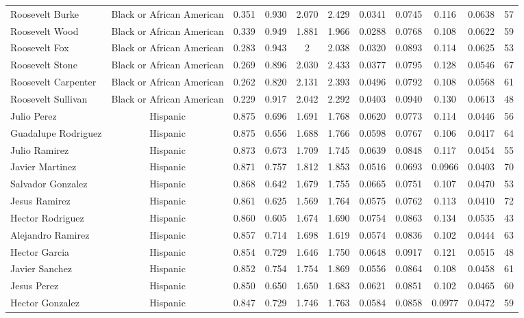 \documentclass[]{article}
\begin{document}
\begin{tabular}{lcccccccccc}
Roosevelt Burke & Black or African American & 0.351 & 0.930 & 2.070 & 2.429 & 0.0341 & 0.0745 & 0.116 & 0.0638 & 57 \\
Roosevelt Wood & Black or African American & 0.339 & 0.949 & 1.881 & 1.966 & 0.0288 & 0.0768 & 0.108 & 0.0622 & 59 \\
Roosevelt Fox & Black or African American & 0.283 & 0.943 & 2 & 2.038 & 0.0320 & 0.0893 & 0.114 & 0.0625 & 53 \\
Roosevelt Stone & Black or African American & 0.269 & 0.896 & 2.030 & 2.433 & 0.0377 & 0.0795 & 0.128 & 0.0546 & 67 \\
Roosevelt Carpenter & Black or African American & 0.262 & 0.820 & 2.131 & 2.393 & 0.0496 & 0.0792 & 0.108 & 0.0568 & 61 \\
Roosevelt Sullivan & Black or African American & 0.229 & 0.917 & 2.042 & 2.292 & 0.0403 & 0.0940 & 0.130 & 0.0613 & 48 \\
Julio Perez & Hispanic & 0.875 & 0.696 & 1.691 & 1.768 & 0.0620 & 0.0773 & 0.114 & 0.0446 & 56 \\
Guadalupe Rodriguez & Hispanic & 0.875 & 0.656 & 1.688 & 1.766 & 0.0598 & 0.0767 & 0.106 & 0.0417 & 64 \\
Julio Ramirez & Hispanic & 0.873 & 0.673 & 1.709 & 1.745 & 0.0639 & 0.0848 & 0.117 & 0.0454 & 55 \\
Javier Martinez & Hispanic & 0.871 & 0.757 & 1.812 & 1.853 & 0.0516 & 0.0693 & 0.0966 & 0.0403 & 70 \\
Salvador Gonzalez & Hispanic & 0.868 & 0.642 & 1.679 & 1.755 & 0.0665 & 0.0751 & 0.107 & 0.0470 & 53 \\
Jesus Ramirez & Hispanic & 0.861 & 0.625 & 1.569 & 1.764 & 0.0575 & 0.0762 & 0.113 & 0.0410 & 72 \\
Hector Rodriguez & Hispanic & 0.860 & 0.605 & 1.674 & 1.690 & 0.0754 & 0.0863 & 0.134 & 0.0535 & 43 \\
Alejandro Ramirez & Hispanic & 0.857 & 0.714 & 1.698 & 1.619 & 0.0574 & 0.0836 & 0.102 & 0.0444 & 63 \\
Hector Garcia & Hispanic & 0.854 & 0.729 & 1.646 & 1.750 & 0.0648 & 0.0917 & 0.121 & 0.0515 & 48 \\
Javier Sanchez & Hispanic & 0.852 & 0.754 & 1.754 & 1.869 & 0.0556 & 0.0864 & 0.108 & 0.0458 & 61 \\
Jesus Perez & Hispanic & 0.850 & 0.650 & 1.650 & 1.683 & 0.0621 & 0.0851 & 0.102 & 0.0465 & 60 \\
Hector Gonzalez & Hispanic & 0.847 & 0.729 & 1.746 & 1.763 & 0.0584 & 0.0858 & 0.0977 & 0.0472 & 59 \\

\end{tabular}
\end{document}
